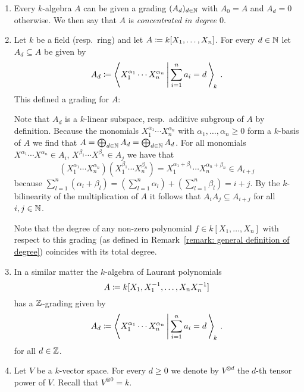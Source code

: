 \begin{example}
  \leavevmode
  \begin{enumerate}
    \item
      Every $k$-algebra $A$ can be given a grading $(A_d)_{d \in \mathbb{N}}$ with $A_0 = A$ and $A_d = 0$ otherwise.
      We then say that $A$ is \emph{concentrated in degree $0$}.
    \item
      Let $k$ be a field (resp.\ ring) and let $A \coloneqq k[X_1, \dotsc, X_n]$.
      For every $d \in \mathbb{N}$ let $A_d \subseteq A$ be given by
      \[
                  A_d 
        \defined  \gen
                  {
                    X_1^{\alpha_1} \dotsm X_n^{\alpha_n}
                  \suchthat*
                    \sum_{i=1}^n a_i = d \,
                  }_{\!k} \,.
      \]
      This defined a grading for $A$:
      
      Note that $A_d$ is a $k$-linear subspace, resp.\ additive subgroup of $A$ by definition.
      Because the monomials $X_1^{\alpha_1} \dotsm X_n^{\alpha_n}$ with $\alpha_1, \dotsc, \alpha_n \geq 0$ form a $k$-basis of $A$ we find that $A = \bigoplus_{d \in \mathbb{N}} A_d = \bigoplus_{d \in \mathbb{N}} A_d$.
      For all monomials $X^{\alpha_1} \dotsm X^{\alpha_n} \in A_i$, $X^{\beta_1} \dotsm X^{\beta_n} \in A_j$ we have that
      \[
            ( X_1^{\alpha_1} \dotsm X_n^{\alpha_n} )
            ( X_1^{\beta_1} \dotsm X_n^{\beta_n} )
        =   X_1^{\alpha_1+\beta_1} \dotsm X_n^{\alpha_n+\beta_n}
        \in A_{i+j} 
      \]
      because $\sum_{l=1}^n (\alpha_l + \beta_l) = (\sum_{l=1}^n \alpha_l) + (\sum_{l=1}^n \beta_l) = i + j$.
      By the $k$-bilinearity of the multiplication of $A$ it follows that $A_i A_j \subseteq A_{i+j}$ for all $i,j \in \mathbb{N}$.
      
      Note that the degree of any non-zero polynomial $f \in k[X_1, \dotsc, X_n]$ with respect to this grading (as defined in Remark~\ref{remark: general definition of degree}) coincides with its total degree.
    \item
      In a similar matter the $k$-algebra of Laurant polynomials
      \[
                  A
        \coloneqq  k[X_1, X_1^{-1}, \dotsc, X_n X_n^{-1}]
      \]
      has a $\mathbb{Z}$-grading given by
      \[
                  A_d 
        \defined  \gen
                  {
                    X_1^{\alpha_1} \dotsm X_n^{\alpha_n}
                  \suchthat*
                    \sum_{i=1}^n a_i = d \,
                  }_{\!k} \,.
      \]
      for all $d \in \mathbb{Z}$.
    \item
      Let $V$ be a $k$-vector space.
      For every $d \geq 0$ we denote by $V^{\otimes d}$ the $d$-th tensor power of $V$.
      Recall that $V^{\otimes 0} = k$.
      

\end{enumerate}
\end{example}
